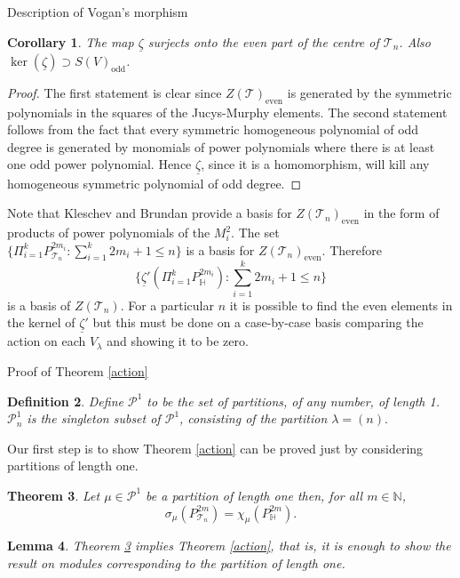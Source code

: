 \documentclass[a4paper,10pt]{amsart}
\newtheorem{theorem}{Theorem}[section]
\newtheorem{definition}[theorem]{Definition}
\newtheorem{corollary}[theorem]{Corollary}
\newtheorem{lemma}[theorem]{Lemma}
\DeclareMathOperator{\odd}{odd}
\DeclareMathOperator{\even}{even}
\begin{document}
\begin{section}{Description of Vogan's morphism}
\begin{corollary} The map $\underline{\zeta}$ surjects onto the even part of the centre of $\mathcal{T}_n$. Also $\ker(\underline{\zeta}) \supset S(V)_{\odd}$.\end{corollary} 

\begin{proof} The first statement is clear since $Z(\mathcal{T})_{\even}$ is generated by the symmetric polynomials in the squares of the Jucys-Murphy elements. The second statement follows from the fact that every symmetric homogeneous polynomial of odd degree is generated by monomials of power polynomials where there is at least one odd power polynomial. Hence $\underline{\zeta}$, since it is a homomorphism, will kill any homogeneous symmetric polynomial of odd degree. \end{proof}

Note that Kleschev and Brundan \cite[3.2]{BK01} provide a basis for $Z(\mathcal{T}_n)_{\even}$ in the form of products of power polynomials of the $M_i^2$. The set $\{ \Pi_{i=1}^{k} P_{\mathcal{T}_n}^{2m_i} : \sum_{i=1}^{k}2m_i+1 \leq n\}$ is a basis for $Z(\mathcal{T}_n)_{\even}$. Therefore 
$$\{ \underline{\zeta}'(\Pi_{i=1}^{k} P_{\mathbb{H}}^{2m_i}) : \sum_{i=1}^{k}2m_i +1 \leq n\}$$ is a basis of $Z(\mathcal{T}_n)$. 
For a particular $n$ it is possible to find the even elements in the kernel of $\underline{\zeta}'$ but this must be done on a case-by-case basis comparing the action on each $V_\lambda$ and showing it to be zero.

\begin{subsection}{Proof of Theorem \ref{action}}


\begin{definition} Define $\mathcal{P}^1$ to be the set of partitions, of any number, of length 1. $\mathcal{P}^1_n$ is the singleton subset of $\mathcal{P}^1$, consisting of the partition $\lambda = (n).$ \end{definition}

Our first step is to show Theorem \ref{action} can be proved just by considering partitions of length one.
\begin{theorem}\label{action2} Let $\mu \in \mathcal{P}^1$ be a partition of length one then, for all $m \in \mathbb{N}$,
$$\sigma_\mu(P_{\mathcal{T}_n}^{2m}) = \chi_\mu (P_{\mathbb{H}}^{2m}).$$
\end{theorem} 


\begin{lemma} Theorem \ref{action2} implies Theorem \ref{action}, that is, it is enough to show the result on modules corresponding to the partition of length one. \end{lemma} 


\end{subsection}
\end{section}
\end{document}
